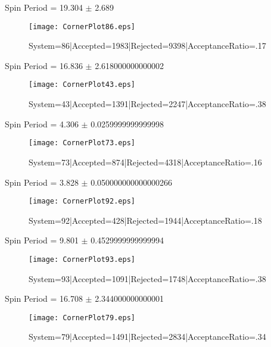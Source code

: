 \documentclass[10pt]{article}
\begin{document}
\begin{center}
        Spin Period = 19.304 $\pm$ 2.689
        \end{center}
\begin{figure}[h] 
        \texttt{[image: CornerPlot86.eps]}
        \caption{System=86|Accepted=1983|Rejected=9398|AcceptanceRatio=.17}
        \label{S86}
        \centering
        \end{figure}
\begin{center}
        Spin Period = 16.836 $\pm$ 2.618000000000002
        \end{center}
\begin{figure}[h] 
        \texttt{[image: CornerPlot43.eps]}
        \caption{System=43|Accepted=1391|Rejected=2247|AcceptanceRatio=.38}
        \label{S43}
        \centering
        \end{figure}
\begin{center}
        Spin Period = 4.306 $\pm$ 0.0259999999999998
        \end{center}
\begin{figure}[h] 
        \texttt{[image: CornerPlot73.eps]}
        \caption{System=73|Accepted=874|Rejected=4318|AcceptanceRatio=.16}
        \label{S73}
        \centering
        \end{figure}
\begin{center}
        Spin Period = 3.828 $\pm$ 0.050000000000000266
        \end{center}
\begin{figure}[h] 
        \texttt{[image: CornerPlot92.eps]}
        \caption{System=92|Accepted=428|Rejected=1944|AcceptanceRatio=.18}
        \label{S92}
        \centering
        \end{figure}
\begin{center}
        Spin Period = 9.801 $\pm$ 0.4529999999999994
        \end{center}
\begin{figure}[h] 
        \texttt{[image: CornerPlot93.eps]}
        \caption{System=93|Accepted=1091|Rejected=1748|AcceptanceRatio=.38}
        \label{S93}
        \centering
        \end{figure}
\begin{center}
        Spin Period = 16.708 $\pm$ 2.344000000000001
        \end{center}
\begin{figure}[h] 
        \texttt{[image: CornerPlot79.eps]}
        \caption{System=79|Accepted=1491|Rejected=2834|AcceptanceRatio=.34}
        \label{S79}
        \centering
        \end{figure}
\end{document}
